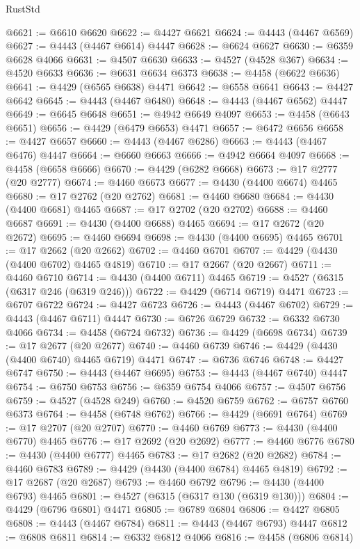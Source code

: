 \begin{lexlean}{RustStd}
\begin{coremodule}
@6621 := @6610 @6620
@6622 := @4427 @6621
@6624 := @4443 (@4467 @6569)
@6627 := @4443 (@4467 @6614) @4447
@6628 := @6624 @6627
@6630 := @6359 @6628 @4066
@6631 := @4507 @6630
@6633 := @4527 (@4528 @367)
@6634 := @4520 @6633
@6636 := @6631 @6634 @6373
@6638 := @4458 (@6622 @6636)
@6641 := @4429 (@6565 @6638) @4471
@6642 := @6558 @6641
@6643 := @4427 @6642
@6645 := @4443 (@4467 @6480)
@6648 := @4443 (@4467 @6562) @4447
@6649 := @6645 @6648
@6651 := @4942 @6649 @4097
@6653 := @4458 (@6643 @6651)
@6656 := @4429 (@6479 @6653) @4471
@6657 := @6472 @6656
@6658 := @4427 @6657
@6660 := @4443 (@4467 @6286)
@6663 := @4443 (@4467 @6476) @4447
@6664 := @6660 @6663
@6666 := @4942 @6664 @4097
@6668 := @4458 (@6658 @6666)
@6670 := @4429 (@6282 @6668)
@6673 := @17 @2777 (@20 @2777)
@6674 := @4460 @6673
@6677 := @4430 (@4400 @6674) @4465
@6680 := @17 @2762 (@20 @2762)
@6681 := @4460 @6680
@6684 := @4430 (@4400 @6681) @4465
@6687 := @17 @2702 (@20 @2702)
@6688 := @4460 @6687
@6691 := @4430 (@4400 @6688) @4465
@6694 := @17 @2672 (@20 @2672)
@6695 := @4460 @6694
@6698 := @4430 (@4400 @6695) @4465
@6701 := @17 @2662 (@20 @2662)
@6702 := @4460 @6701
@6707 := @4429 (@4430 (@4400 @6702) @4465 @4819)
@6710 := @17 @2667 (@20 @2667)
@6711 := @4460 @6710
@6714 := @4430 (@4400 @6711) @4465
@6719 := @4527 (@6315 (@6317 @246 (@6319 @246)))
@6722 := @4429 (@6714 @6719) @4471
@6723 := @6707 @6722
@6724 := @4427 @6723
@6726 := @4443 (@4467 @6702)
@6729 := @4443 (@4467 @6711) @4447
@6730 := @6726 @6729
@6732 := @6332 @6730 @4066
@6734 := @4458 (@6724 @6732)
@6736 := @4429 (@6698 @6734)
@6739 := @17 @2677 (@20 @2677)
@6740 := @4460 @6739
@6746 := @4429 (@4430 (@4400 @6740) @4465 @6719) @4471
@6747 := @6736 @6746
@6748 := @4427 @6747
@6750 := @4443 (@4467 @6695)
@6753 := @4443 (@4467 @6740) @4447
@6754 := @6750 @6753
@6756 := @6359 @6754 @4066
@6757 := @4507 @6756
@6759 := @4527 (@4528 @249)
@6760 := @4520 @6759
@6762 := @6757 @6760 @6373
@6764 := @4458 (@6748 @6762)
@6766 := @4429 (@6691 @6764)
@6769 := @17 @2707 (@20 @2707)
@6770 := @4460 @6769
@6773 := @4430 (@4400 @6770) @4465
@6776 := @17 @2692 (@20 @2692)
@6777 := @4460 @6776
@6780 := @4430 (@4400 @6777) @4465
@6783 := @17 @2682 (@20 @2682)
@6784 := @4460 @6783
@6789 := @4429 (@4430 (@4400 @6784) @4465 @4819)
@6792 := @17 @2687 (@20 @2687)
@6793 := @4460 @6792
@6796 := @4430 (@4400 @6793) @4465
@6801 := @4527 (@6315 (@6317 @130 (@6319 @130)))
@6804 := @4429 (@6796 @6801) @4471
@6805 := @6789 @6804
@6806 := @4427 @6805
@6808 := @4443 (@4467 @6784)
@6811 := @4443 (@4467 @6793) @4447
@6812 := @6808 @6811
@6814 := @6332 @6812 @4066
@6816 := @4458 (@6806 @6814)

\end{coremodule}
\end{lexlean}
